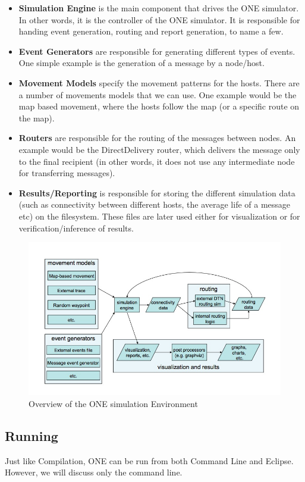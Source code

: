 \begin{itemize}
  \item \textbf{Simulation Engine} is the main component that drives the ONE simulator. In other words, it is the controller of the ONE simulator. It is responsible for handing event generation, routing and report generation, to name a few.
  \item \textbf{Event Generators} are responsible for generating different types of events. One simple example is the generation of a message by a node/host.
  \item \textbf{Movement Models} specify the movement patterns for the hosts. There are a number of movements models that we can use. One example would be the map based movement, where the hosts follow the map (or a specific route on the map).
  \item \textbf{Routers} are responsible for the routing of the messages between nodes. An example would be the DirectDelivery router, which delivers the message only to the final recipient (in other words, it does not use any intermediate node for transferring messages).
  \item \textbf{Results/Reporting} is responsible for storing the different simulation data (such as connectivity between different hosts, the average life of a message etc) on the filesystem. These files are later used either for visualization or for verification/inference of results.
\end{itemize}
\begin{figure}[h]
\includegraphics[scale=0.5]{./figures/one}
\caption{Overview of the ONE simulation Environment \cite{keranen-theone}}
\label{fig:onesimulatorenvironment}
\end{figure}

\subsection{Running}
Just like Compilation, ONE can be run from both Command Line and Eclipse. However, we will discuss only the command line.

